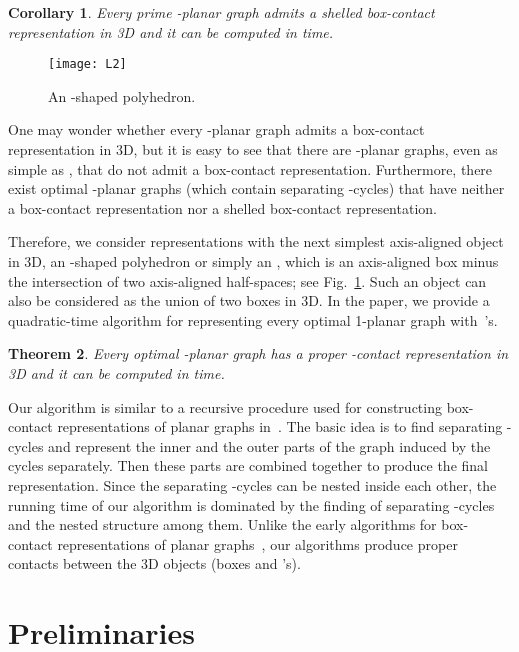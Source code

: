 \documentclass{article}
\newtheorem{theorem}{Theorem}
\newtheorem{corollary}[theorem]{Corollary}
\newcommand{\wormhole}[1]
{
\newcounter{#1}
\setcounter{#1}{\value{theorem}}
}
\newcommand{\LL}{\xspace}
\newcommand{\LLs}{'s\xspace}
\begin{document}
\wormhole{th-prime}
\begin{corollary}
\label{th:prime}
Every prime -planar graph  admits a shelled box-contact representation
in 3D and it can be computed in  time.
\end{corollary}


\begin{figure}
\centering
    \texttt{[image: L2]}
  \caption{An -shaped polyhedron.}
  \label{fig:L}
\end{figure}
One may wonder whether every -planar graph admits a box-contact representation in 3D, but it is easy to see that there are -planar graphs, even as simple as , that do not admit a
box-contact representation. Furthermore, there exist optimal -planar graphs (which contain separating -cycles) that have neither a box-contact representation nor a shelled box-contact representation.


Therefore, we consider representations with the next simplest
axis-aligned object in 3D, an -shaped polyhedron
or simply an \LL, which is an axis-aligned box minus the intersection of
two axis-aligned half-spaces; see Fig.~\ref{fig:L}. Such an object can also be
considered as the union of two boxes in 3D. In the paper, we provide a quadratic-time algorithm
for representing every optimal 1-planar graph with~\LLs.

\wormhole{thm-1-planar}
\begin{theorem}
\label{thm:1-planar}
 Every optimal -planar graph  has a proper \LL-contact representation in 3D and it can be computed in  time.
\end{theorem}

Our algorithm is similar to a recursive procedure used for constructing
box-contact representations of planar graphs in~\cite{FF11,Tho88}. The basic idea is to find
separating -cycles and represent the inner and the outer parts of the graph induced by the cycles
separately. Then these parts are combined together to produce the final representation.
Since the separating -cycles can be nested inside each other, the
running time of our algorithm is dominated by the finding of separating -cycles
and the nested structure among them.
Unlike the early algorithms for box-contact representations of planar graphs~\cite{FF11,Tho88}, our algorithms produce proper contacts between the 3D objects (boxes and \LLs).





\section{Preliminaries}
\label{sec:prelim}
\end{document}
